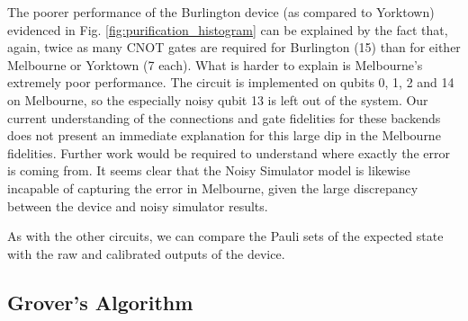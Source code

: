 The poorer performance of the Burlington device (as compared to Yorktown)
evidenced in Fig. \ref{fig:purification_histogram} can be explained by the fact
that, again, twice as many CNOT gates are required for Burlington (15) than for
either Melbourne or Yorktown (7 each). What is harder to explain is Melbourne's
extremely poor performance. The circuit is implemented on qubits 0, 1, 2 and 14
on Melbourne, so the especially noisy qubit 13 is left out of the system. Our
current understanding of the connections and gate fidelities for these backends
does not present an immediate explanation for this large dip in the Melbourne
fidelities. Further work would be required to understand where exactly the error
is coming from. It seems clear that the Noisy Simulator model is likewise
incapable of capturing the error in Melbourne, given the large discrepancy
between the device and noisy simulator results.

As with the other circuits, we can compare the Pauli sets of the expected state
with the raw and calibrated outputs of the device.

\subsection{Grover's Algorithm}



